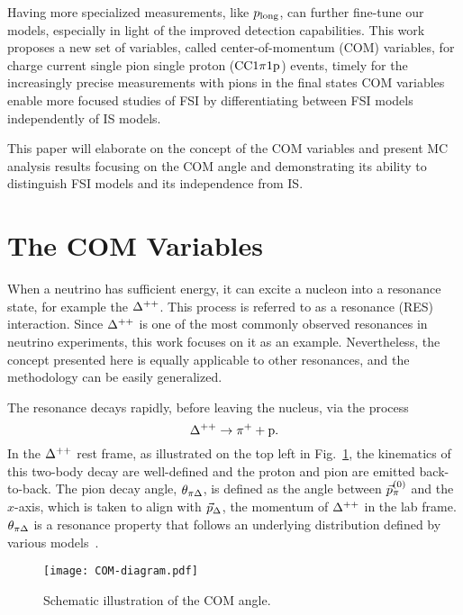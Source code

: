 Having more specialized measurements, like $p_{\textrm{long}}$, can further fine-tune our models, especially in light of the improved detection capabilities. 
This work proposes a new set of variables, called center-of-momentum (COM) variables, for charge current single pion single proton ($\textrm{CC}1\pi1\textrm{p}$) events, timely for the increasingly precise measurements with pions in the final states
COM variables enable more focused studies of FSI by differentiating between FSI models independently of IS models.

This paper will elaborate on the concept of the COM variables and present MC analysis results focusing on the COM angle and demonstrating its ability to distinguish FSI models and its independence from IS.

\section{The COM Variables}
\label{sec:com}
When a neutrino has sufficient energy, it can excite a nucleon into a resonance state, for example the $\Delta^{++}$. 
This process is referred to as a resonance (RES) interaction.
Since $\Delta^{++}$ is one of the most commonly observed resonances in neutrino experiments, this work focuses on it as an example.
Nevertheless, the concept presented here is equally applicable to other resonances, and the methodology can be easily generalized.

The resonance decays rapidly, before leaving the nucleus, via the process
\begin{equation}
	\Delta^{++} \rightarrow \pi^+ + \textrm{p}.
\end{equation}
In the $\Delta^{++}$ rest frame, as illustrated on the top left in Fig.~\ref{fig:COM-diagram}, the kinematics of this two-body decay are well-defined and the proton and pion are emitted back-to-back.
The pion decay angle, $\theta_{\pi\Delta}$, is defined as the angle between $\vec{p}_{\pi}^{(0)}$ and the $x$-axis, which is taken to align with $\vec{p}_{\Delta}$, the momentum of $\Delta^{++}$ in the lab frame. 
$\theta_{\pi\Delta}$ is a resonance property that follows an underlying distribution defined by various models~\cite{Rein:1987cb,Kabirnezhad:2017jmf,Kabirnezhad:2020wtp,Kabirnezhad:2022znc}.

\begin{figure}[ht!]
    \centering
    \texttt{[image: COM-diagram.pdf]}
    \caption{Schematic illustration of the COM angle.  }
    \label{fig:COM-diagram}
\end{figure}

